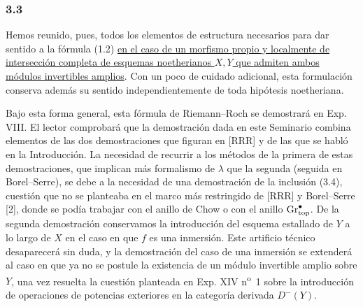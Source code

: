 \subsubsection*{3.3}
Hemos reunido, pues, todos los elementos de estructura necesarios para dar
sentido a la fórmula (1.2) \uline{en el caso de un morfismo propio y
localmente de intersección completa de esquemas noetherianos $X,Y$ que
admiten ambos módulos invertibles amplios}. Con un poco de cuidado adicional,
esta formulación conserva además su sentido independientemente de toda
hipótesis noetheriana.

Bajo esta forma general, esta fórmula de Riemann--Roch se demostrará en Exp.
VIII. El lector comprobará que la demostración dada en este Seminario
combina elementos de las dos demostraciones que figuran en [RRR] y de las
que se habló en la Introducción. La necesidad de recurrir a los métodos de la
primera de estas demostraciones, que implican más formalismo de
$\lambda$ que la segunda (seguida en Borel--Serre), se debe a la necesidad de
una demostración de la inclusión (3.4), cuestión que no se planteaba en el
marco más restringido de [RRR] y Borel--Serre [2], donde se podía trabajar
con el anillo de Chow o con el anillo $\operatorname{Gr}^\bullet_{\mathrm{top}}$. De la
segunda demostración conservamos la introducción del esquema estallado de
$Y$ a lo largo de $X$ en el caso en que $f$ es una inmersión. Este
artificio técnico desaparecerá sin duda, y la demostración del caso de una
inmersión se extenderá al caso en que ya no se postule la existencia de un
módulo invertible amplio sobre $Y$, una vez resuelta la cuestión planteada
en Exp. XIV n\textsuperscript{o}~1 sobre la introducción de operaciones de
potencias exteriores en la categoría derivada $D^-(Y)$.
